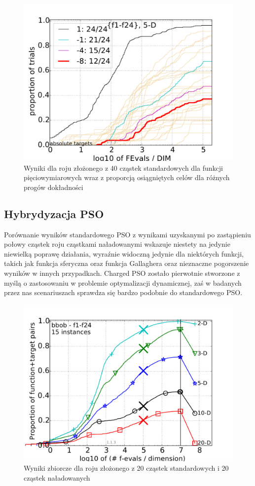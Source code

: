 \documentclass[12pt, twoside, openany, abstract=on]{report}
\theoremstyle{definition}
\begin{document}
\begin{figure}[H]
    \centering
    \includegraphics[scale=.75]{charts/1node40st_5D.pdf} 
 \caption{Wyniki dla roju złożonego z 40 cząstek standardowych dla funkcji pięciowymiarowych wraz z proporcją osiągniętych celów dla różnych progów dokładności}
\end{figure}

\subsection{Hybrydyzacja PSO}
Porównanie wyników standardowego PSO z wynikami uzyskanymi po zastąpieniu połowy cząstek roju cząstkami naładowanymi wskazuje niestety na jedynie niewielką poprawę działania, wyraźnie widoczną jedynie dla niektórych funkcji, takich jak funkcja sferyczna oraz funkcja Gallaghera oraz nieznaczne pogorszenie wyników w innych przypadkach. Charged PSO zostało pierwotnie stworzone z myślą o zastosowaniu w problemie optymalizacji dynamicznej, zaś w badanych przez nas scenariuszach sprawdza się bardzo podobnie do standardowego PSO.

\begin{figure}[H]
    \centering
    \includegraphics[scale=.75]{charts/1node20ch20st.pdf} 
 \caption{Wyniki zbiorcze dla roju złożonego z 20 cząstek standardowych i 20 cząstek naładowanych}
\end{figure}
\end{document}
